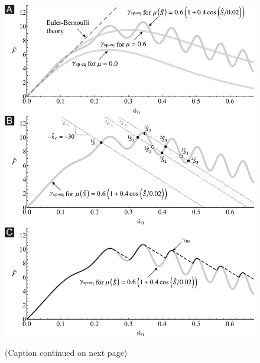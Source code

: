 \documentclass[preprint,10pt,times]{elsarticle}
\numberwithin{equation}{section}
\begin{document}
\begin{figure}
\centering{}
\includegraphics[width=1\textwidth]{../Figures_Submit/Model_V2.pdf}
\label{fig:NBSComparison}
\caption{(Caption continued on next page)}
\end{figure}
\end{document}
